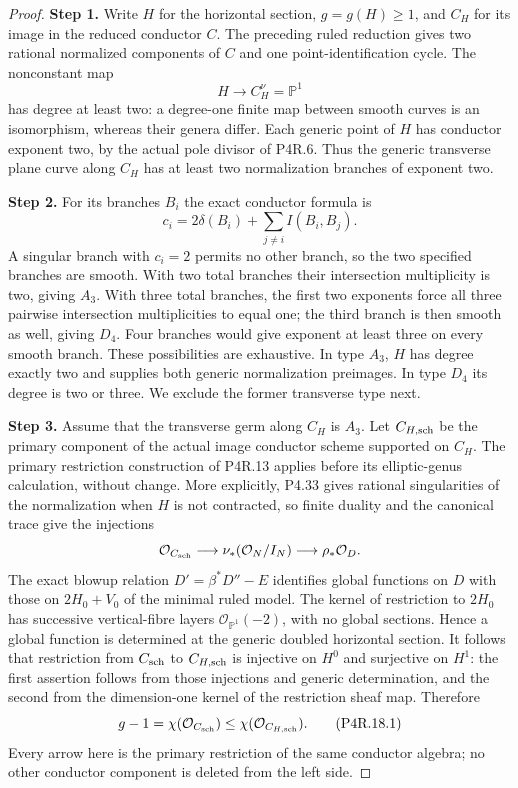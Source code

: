 \begin{proof}
\noindent\textbf{Step 1.} Write $H$ for the horizontal section, $g=g(H)\ge1$, and
$C_H$ for its image in the reduced conductor $C$. The preceding
ruled reduction gives two rational normalized components of $C$
and one point-identification cycle. The nonconstant map
\[
                         H\longrightarrow C_H^\nu=\mathbb P^1
\]
has degree at least two: a degree-one finite map between smooth
curves is an isomorphism, whereas their genera differ. Each
generic point of $H$ has conductor exponent two, by the actual
pole divisor of P4R.6. Thus the generic transverse plane curve
along $C_H$ has at least two normalization branches of exponent two.

\noindent\textbf{Step 2.} For its branches $B_i$ the exact conductor formula is
\[
             c_i=2\delta(B_i)+\sum_{j\ne i}I(B_i,B_j).
\]
A singular branch with $c_i=2$ permits no other branch,
so the two specified branches are smooth. With two total
branches their intersection multiplicity is two, giving $A_3$.
With three total branches, the first two exponents force all
three pairwise intersection multiplicities to equal one;
the third branch is then smooth as well, giving $D_4$.
Four branches would give exponent at least three on every
smooth branch. These possibilities are exhaustive. In type
$A_3$, $H$ has degree exactly two and supplies both generic
normalization preimages. In type $D_4$ its degree is two or
three. We exclude the former transverse type next.

\noindent\textbf{Step 3.} Assume that the transverse germ along $C_H$ is $A_3$.
Let $C_{H,\rm sch}$ be the primary component of the actual
image conductor scheme supported on $C_H$. The primary
restriction construction of P4R.13 applies before its
elliptic-genus calculation, without change. More explicitly,
P4.33 gives rational singularities of the normalization when
$H$ is not contracted, so finite duality and the canonical
trace give the injections
\[
 \mathcal O_{C_{\rm sch}}\longrightarrow
 \nu_*(\mathcal O_N/I_N)\longrightarrow\rho_*\mathcal O_D.
\]
The exact blowup relation $D'=\beta^*D''-E$ identifies
global functions on $D$ with those on $2H_0+V_0$ of the
minimal ruled model. The kernel of restriction to $2H_0$
has successive vertical-fibre layers
$\mathcal O_{\mathbb P^1}(-2)$, with no global sections.
Hence a global function is determined at the generic doubled
horizontal section. It follows that restriction from
$C_{\rm sch}$ to $C_{H,\rm sch}$ is injective on $H^0$
and surjective on $H^1$: the first assertion follows from
those injections and generic determination, and the second
from the dimension-one kernel of the restriction sheaf map.
Therefore
\[
                 g-1=\chi(\mathcal O_{C_{\rm sch}})
                    \le\chi(\mathcal O_{C_{H,\rm sch}}).
                                                            \tag{P4R.18.1}
\]
Every arrow here is the primary restriction of the same
conductor algebra; no other conductor component is deleted
from the left side.


\end{proof}
